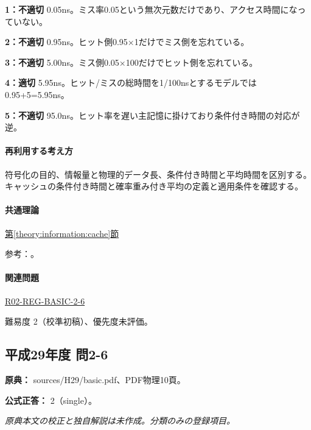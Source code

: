 \noindent\textbf{1：不適切} 0.05ns。ミス率0.05という無次元数だけであり、アクセス時間になっていない。\par

\noindent\textbf{2：不適切} 0.95ns。ヒット側0.95×1だけでミス側を忘れている。\par

\noindent\textbf{3：不適切} 5.00ns。ミス側0.05×100だけでヒット側を忘れている。\par

\noindent\textbf{4：適切} 5.95ns。ヒット/ミスの総時間を1/100nsとするモデルでは0.95+5=\allowbreak{}5.95ns。\par

\noindent\textbf{5：不適切} 95.0ns。ヒット率を遅い主記憶に掛けており条件付き時間の対応が逆。\par

\paragraph{再利用する考え方} 符号化の目的、情報量と物理的データ長、条件付き時間と平均時間を区別する。キャッシュの条件付き時間と確率重み付き平均の定義と適用条件を確認する。

\paragraph{共通理論} \hyperref[theory:information:cache]{第\ref*{theory:information:cache}節}

\par 参考：\cite{info_cache}。

\paragraph{関連問題} \hyperref[q:r02-reg-basic-2-6]{R02-REG-BASIC-2-6}

\par 難易度 2（校準初稿）、優先度未評価。

\subsection{平成29年度 問2-6}
\label{q:h29-reg-basic-2-6}

\noindent\textbf{原典：} sources/H29/basic.pdf、PDF物理10頁。

\textbf{公式正答：} 2（single）。

\par\textit{原典本文の校正と独自解説は未作成。分類のみの登録項目。}

